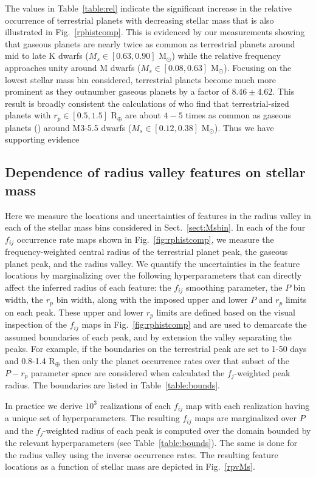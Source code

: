 \documentclass[twocolumn]{emulateapj}
\begin{document}


The values in Table~\ref{table:rel} indicate the significant increase in the relative occurrence of terrestrial
planets with decreasing stellar mass that is also illustrated in Fig.~\ref{rphistcomp}. This is evidenced by
our measurements showing that gaseous planets are nearly twice as common as terrestrial planets
around mid to late K dwarfs ($M_s \in [0.63,0.90]$ M$_{\odot}$) while the relative frequency approaches unity
around M dwarfs ($M_s \in [0.08,0.63]$ M$_{\odot}$). Focusing on the lowest stellar mass bin considered,
terrestrial planets become much more prominent as they outnumber gaseous planets by a factor of
$8.46\pm 4.62$. This result is broadly
consistent the calculations of \cite{hardegree19} who find that terrestrial-sized 
planets with $r_p \in[0.5,1.5]$ R$_{\oplus}$ are about $4-5$ times as common as gaseous planets ()
around M3-5.5 dwarfs ($M_s \in [0.12,0.38]$ M$_{\odot}$). Thus we have supporting evidence 

\subsection{Dependence of radius valley features on stellar mass}
Here we measure the locations and uncertainties of features in the radius valley in each of the stellar
mass bins considered in Sect.~\ref{sect:Msbin}. In each of the four $f_{ij}$ occurrence rate maps shown
in Fig.~\ref{fig:rphistcomp}, we measure the frequency-weighted central radius of the terrestrial planet peak,
the gaseous planet peak, and the radius valley. We quantify the uncertainties in the feature locations by
marginalizing over the following hyperparameters that can directly affect the inferred radius of each feature:
the $f_{ij}$ smoothing parameter, the $P$ bin width, the $r_p$ bin width, along with the imposed upper and
lower $P$ and $r_p$ limits on each peak. These upper and lower $r_p$ limits are defined based on the visual
inspection of the $f_{ij}$ maps in Fig.~\ref{fig:rphistcomp} and are used to demarcate the assumed
boundaries of each peak, and by extension the valley separating the peaks.
For example, if the boundaries on the terrestrial peak are set to 1-50 days and 0.8-1.4 R$_{\oplus}$ then only
the planet occurrence rates over that subset of the $P-r_p$ parameter space are considered when calculated the
$f_j$-weighted peak radius.  
The boundaries are listed in Table~\ref{table:bounds}.

In practice we derive $10^3$ realizations of each $f_{ij}$ map with each realization having a unique set of
hyperparameters. The resulting $f_{ij}$ maps are marginalized over $P$ and the $f_j$-weighted radius of
each peak is computed over the domain bounded by the relevant hyperparameters (see Table~\ref{table:bounds}).
The same is done for the radius valley using the inverse occurrence rates.
The resulting feature locations as a function of stellar mass are depicted in Fig.~\ref{rpvMs}.
\end{document}
